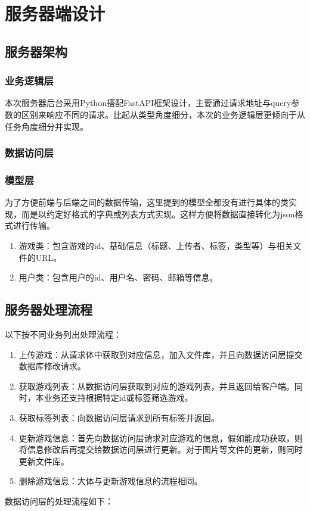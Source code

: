 \documentclass[12pt]{ctexart} %
\begin{document}
\section{服务器端设计}

\subsection{服务器架构}
\subsubsection{业务逻辑层}
本次服务器后台采用Python搭配FastAPI框架设计，主要通过请求地址与query参数的区别来响应不同的请求。比起从类型角度细分，本次的业务逻辑层更倾向于从任务角度细分并实现。
\subsubsection{数据访问层}
\subsubsection{模型层}
为了方便前端与后端之间的数据传输，这里提到的模型全都没有进行具体的类实现，而是以约定好格式的字典或列表方式实现。这样方便将数据直接转化为json格式进行传输。
\begin{enumerate}
  \item 游戏类：包含游戏的id、基础信息（标题、上传者、标签，类型等）与相关文件的URL。
  \item 用户类：包含用户的id、用户名、密码、邮箱等信息。
\end{enumerate}
\subsection{服务器处理流程}
以下按不同业务列出处理流程：
\begin{enumerate}
  \item 上传游戏：从请求体中获取到对应信息，加入文件库，并且向数据访问层提交数据库修改请求。
  \item 获取游戏列表：从数据访问层获取到对应的游戏列表，并且返回给客户端。同时，本业务还支持根据特定id或标签筛选游戏。
  \item 获取标签列表：向数据访问层请求到所有标签并返回。
  \item 更新游戏信息：首先向数据访问层请求对应游戏的信息，假如能成功获取，则将信息修改后再提交给数据访问层进行更新。对于图片等文件的更新，则同时更新文件库。
  \item 删除游戏信息：大体与更新游戏信息的流程相同。
\end{enumerate}
数据访问层的处理流程如下：
\end{document}
